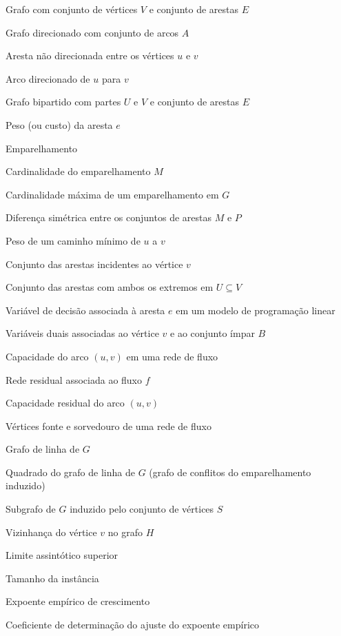 \begin{simbolos}
    \item[$G=(V,E)$] Grafo com conjunto de vértices $V$ e conjunto de arestas $E$
    \item[$D=(V,A)$] Grafo direcionado com conjunto de arcos $A$
    \item[$\{u,v\}$] Aresta não direcionada entre os vértices $u$ e $v$
    \item[$(u,v)$] Arco direcionado de $u$ para $v$
    \item[$G=(U,V;E)$] Grafo bipartido com partes $U$ e $V$ e conjunto de arestas $E$
    \item[$w(e)$] Peso (ou custo) da aresta $e$
    \item[$M$] Emparelhamento
    \item[$|M|$] Cardinalidade do emparelhamento $M$
    \item[$\nu(G)$] Cardinalidade máxima de um emparelhamento em $G$
    \item[$M \ominus P$] Diferença simétrica entre os conjuntos de arestas $M$ e $P$
    \item[$\delta(u,v)$] Peso de um caminho mínimo de $u$ a $v$
    \item[$\delta(v)$] Conjunto das arestas incidentes ao vértice $v$
    \item[$E(U)$] Conjunto das arestas com ambos os extremos em $U \subseteq V$
    \item[$x_e$] Variável de decisão associada à aresta $e$ em um modelo de programação linear
    \item[$y_v, z_B$] Variáveis duais associadas ao vértice $v$ e ao conjunto ímpar $B$
    \item[$c(u,v)$] Capacidade do arco $(u,v)$ em uma rede de fluxo
    \item[$G_f$] Rede residual associada ao fluxo $f$
    \item[$c_f(u,v)$] Capacidade residual do arco $(u,v)$
    \item[$s, t$] Vértices fonte e sorvedouro de uma rede de fluxo
    \item[$L(G)$] Grafo de linha de $G$
    \item[$L(G)^2$] Quadrado do grafo de linha de $G$ (grafo de conflitos do emparelhamento induzido)
    \item[$G{[S]}$] Subgrafo de $G$ induzido pelo conjunto de vértices $S$
    \item[$N_H(v)$] Vizinhança do vértice $v$ no grafo $H$
    \item[$O(\cdot)$] Limite assintótico superior
    \item[$n$] Tamanho da instância
    \item[$k$] Expoente empírico de crescimento
    \item[$R^2$] Coeficiente de determinação do ajuste do expoente empírico
\end{simbolos}

